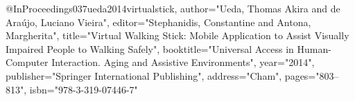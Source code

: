 @InProceedings{037ueda2014virtualstick,
author="Ueda, Thomas Akira
and de Ara{\'u}jo, Luciano Vieira",
editor="Stephanidis, Constantine
and Antona, Margherita",
title="Virtual Walking Stick: Mobile Application to Assist Visually Impaired People to Walking Safely",
booktitle="Universal Access in Human-Computer Interaction. Aging and Assistive Environments",
year="2014",
publisher="Springer International Publishing",
address="Cham",
pages="803--813",
isbn="978-3-319-07446-7"
}